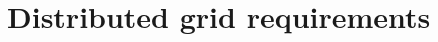 %

%

%

%

\newpage

\section{Distributed grid requirements}

\setcounter{section}{0}
\renewcommand{\thesection}{\shortname\arabic{section}}
\renewcommand{\thesubsection}{\shortname\arabic{section}.\arabic{subsection}}
\renewcommand{\thesubsubsection}{\shortname\arabic{section}.\arabic{subsection}.\arabic{subsubsection}}



%

% 
%

%




















